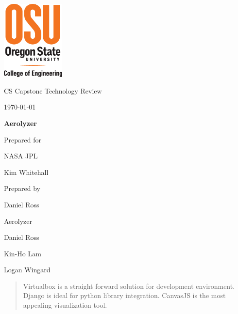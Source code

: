 \documentclass[onecolumn, draftclsnofoot,10pt, compsoc]{IEEEtran}
\def \CapstoneTeamName{		Aerolyzer}
\def \GroupMemberOne{			Daniel Ross}
\def \GroupMemberTwo{			Kin-Ho Lam}
\def \GroupMemberThree{			Logan Wingard}
\def \CapstoneProjectName{		Aerolyzer}
\def \CapstoneSponsorCompany{	NASA JPL}
\def \CapstoneSponsorPerson{		Kim Whitehall}
\def \DocType{		%
				Technology Review
				}
\newcommand{\NameSigPair}[1]{\par
\makebox[2.75in][r]{#1} \hfil 	\makebox[3.25in]{\makebox[2.25in]{\hrulefill} \hfill		\makebox[.75in]{\hrulefill}}
\par\vspace{-12pt} \textit{\tiny\noindent
\makebox[2.75in]{} \hfil		\makebox[3.25in]{\makebox[2.25in][r]{Signature} \hfill	\makebox[.75in][r]{Date}}}}
\renewcommand{\NameSigPair}[1]{#1}
\begin{document}
\begin{titlepage}
    \begin{singlespace}
    	\includegraphics[height=4cm]{coe_v_spot1}
        \hfill 
        \par\vspace{.2in}
        \centering
        \scshape{
            \huge CS Capstone \DocType \par
            {\large\today}\par
            \vspace{.5in}
            \textbf{\Huge\CapstoneProjectName}\par
            \vfill
            {\large Prepared for}\par
            \Huge \CapstoneSponsorCompany\par
            \vspace{5pt}
            {\Large\NameSigPair{\CapstoneSponsorPerson}\par}
            {\large Prepared by }\par
            \GroupMemberOne\par
            \CapstoneTeamName\par 
            \vspace{5pt}
            {\large
                \NameSigPair{\GroupMemberOne}\par
                \NameSigPair{\GroupMemberTwo}\par
                \NameSigPair{\GroupMemberThree}\par
            }
            \vspace{20pt}
        }
        \begin{abstract}
        	Virtualbox is a straight forward solution for development environment.
			Django is ideal for python library integration.
			CanvasJS is the most appealing visualization tool.
        \end{abstract}     
    \end{singlespace}
\end{titlepage}
\newpage
{}
\tableofcontents
\clearpage
\end{document}
